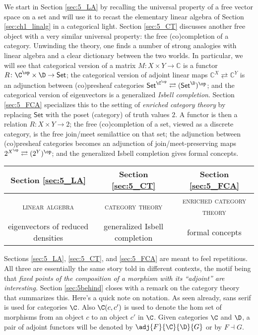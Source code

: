 We start in Section \ref{sec:5_LA} by recalling the universal property of a free vector space on a set and will use it to recast the elementary linear algebra of Section \ref{sec:ch1_linalg} in a categorical light. Section \ref{sec:5_CT} discusses another free object with a very similar universal property: the free (co)completion of a category. Unwinding the theory, one finds a number of strong analogies with linear algebra and a clear dictionary between the two worlds. In particular, we will see that categorical version of a matrix $M\colon X\times Y\to\mathbb{C}$ is a functor $R\colon \C^{\op}\times\D\to\mathsf{Set}$; the categorical version of adjoint linear maps $\mathbb{C}^X\rightleftarrows \mathbb{C}^Y$ is an adjunction between (co)presheaf categories $\mathsf{Set}^{\C^{\op}}\rightleftarrows (\mathsf{Set}^\D)^{\op}$; and the categorical version of eigenvectors is a generalized \textit{Isbell completion}. Section \ref{sec:5_FCA} specializes this to the setting of \textit{enriched category theory} by replacing $\mathsf{Set}$ with the poset (category) of truth values $2$. A functor is then a relation $R\colon X\times Y\to 2$; the free (co)completion of a set, viewed as a discrete category, is the free join/meet semilattice on that set; the adjunction between (co)presheaf categories becomes an adjunction of join/meet-preserving maps $2^{X^{\op}}\rightleftarrows (2^Y)^{\op}$; and the generalized Isbell completion gives formal concepts.
\begin{fullwidth}
\begin{center}
\begin{table}[h!]
\begin{tabular}{@{}c|c|c@{}}
\toprule
\textbf{Section \ref{sec:5_LA}} & \textbf{Section \ref{sec:5_CT}} & \textbf{Section \ref{sec:5_FCA}} \\
\midrule
\textsc{linear algebra} & \textsc{category theory} & \textsc{enriched category theory} \\
eigenvectors of reduced densities & generalized Isbell completion & formal concepts\\
\bottomrule
\end{tabular}
\end{table}
\end{center}
\end{fullwidth}

Sections \ref{sec:5_LA}, \ref{sec:5_CT}, and \ref{sec:5_FCA} are meant to feel repetitious. All three are essentially the same story told in different contexts, the motif being that \textit{fixed points of the composition of a morphism with its ``adjoint'' are interesting.} Section \ref{sec:5behind} closes with a remark on the category theory that summarizes this. Here's a quick note on notation. As seen already, sans serif is used for categories $\C$. Also $\C(c,c')$ is used to denote the hom set of morphisms from an object $c$ to an object $c'$ in $\C$. Given categories $\C$ and $\D$, a pair of adjoint functors will be denoted by $\adj{F}{\C}{\D}{G}$ or by $F\dashv G.$



